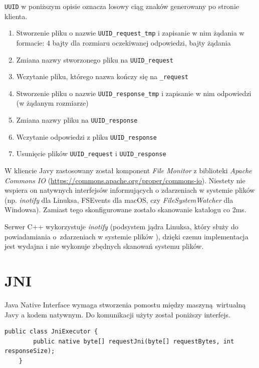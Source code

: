 \texttt{UUID} w poniższym opisie oznacza losowy ciąg znaków generowany po stronie klienta.
\begin{enumerate}
    \item Stworzenie pliku o nazwie \texttt{UUID\_request\_tmp} i zapisanie w nim żądania w formacie: 4 bajty dla rozmiaru oczekiwanej odpowiedzi, bajty żądania
    \item Zmiana nazwy stworzonego pliku na \texttt{UUID\_request}
    \item Wczytanie pliku, którego nazwa kończy się na \texttt{\_request}
    \item Stworzenie pliku o nazwie \texttt{UUID\_response\_tmp} i zapisanie w nim odpowiedzi (w żądanym rozmiarze)
    \item Zmiana nazwy pliku na \texttt{UUID\_response}
    \item Wczytanie odpowiedzi z pliku \texttt{UUID\_response}
    \item Usunięcie plików \texttt{UUID\_request} i \texttt{UUID\_response}
\end{enumerate}

W kliencie Javy zastosowany został komponent \textit{File Monitor} z biblioteki \textit{Apache Commons IO} (\url{https://commons.apache.org/proper/commons-io}). Niestety nie wspiera on natywnych interfejsów informujących o zdarzeniach w systemie plików (np. \textit{inotify} dla Linuksa, FSEvents dla macOS, czy \textit{FileSystemWatcher} dla Windowsa). Zamiast tego skonfigurowane zostało skanowanie katalogu co 2ms.

Serwer C++ wykorzystuje \textit{inotify} (podsystem jądra Linuksa, który służy do powiadamiania o~zdarzeniach w systemie plików \cite{inotify_man}), dzięki czemu implementacja jest wydajna i nie wykonuje zbędnych skanowań systemu plików.


\section{JNI}

Java Native Interface wymaga stworzenia pomostu między maszyną wirtualną Javy a kodem natywnym. Do komunikacji użyty został poniższy interfejs.

\begin{lstlisting}[caption={Metoda javy, która wymaga natywnej implementacji.},captionpos=b]
    public class JniExecutor {
        public native byte[] requestJni(byte[] requestBytes, int responseSize);
    }
\end{lstlisting}


